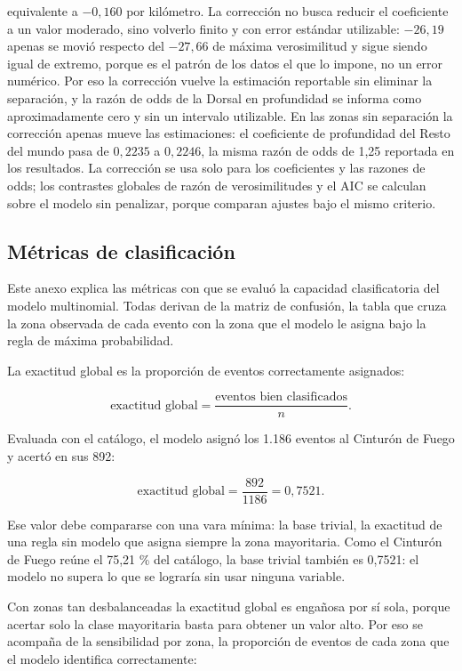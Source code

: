 \documentclass[
  spanish,
  letterpaper,
  DIV=11,
  numbers=noendperiod]{scrartcl}
\begin{document}
equivalente a \(-0{,}160\) por kilómetro. La corrección no busca reducir
el coeficiente a un valor moderado, sino volverlo finito y con error
estándar utilizable: \(-26{,}19\) apenas se movió respecto del
\(-27{,}66\) de máxima verosimilitud y sigue siendo igual de extremo,
porque es el patrón de los datos el que lo impone, no un error numérico.
Por eso la corrección vuelve la estimación reportable sin eliminar la
separación, y la razón de odds de la Dorsal en profundidad se informa
como aproximadamente cero y sin un intervalo utilizable. En las zonas
sin separación la corrección apenas mueve las estimaciones: el
coeficiente de profundidad del Resto del mundo pasa de \(0{,}2235\) a
\(0{,}2246\), la misma razón de odds de 1,25 reportada en los
resultados. La corrección se usa solo para los coeficientes y las
razones de odds; los contrastes globales de razón de verosimilitudes y
el AIC se calculan sobre el modelo sin penalizar, porque comparan
ajustes bajo el mismo criterio.

\subsection{Métricas de
clasificación}\label{sec-anexo-metricas-clasificacion}

Este anexo explica las métricas con que se evaluó la capacidad
clasificatoria del modelo multinomial. Todas derivan de la matriz de
confusión, la tabla que cruza la zona observada de cada evento con la
zona que el modelo le asigna bajo la regla de máxima probabilidad.

La exactitud global es la proporción de eventos correctamente asignados:

\[
\text{exactitud global}=\frac{\text{eventos bien clasificados}}{n}.
\]

Evaluada con el catálogo, el modelo asignó los 1.186 eventos al Cinturón
de Fuego y acertó en sus 892:

\[
\text{exactitud global}=\frac{892}{1186}=0{,}7521.
\]

Ese valor debe compararse con una vara mínima: la base trivial, la
exactitud de una regla sin modelo que asigna siempre la zona
mayoritaria. Como el Cinturón de Fuego reúne el 75,21 \% del catálogo,
la base trivial también es 0,7521: el modelo no supera lo que se
lograría sin usar ninguna variable.

Con zonas tan desbalanceadas la exactitud global es engañosa por sí
sola, porque acertar solo la clase mayoritaria basta para obtener un
valor alto. Por eso se acompaña de la sensibilidad por zona, la
proporción de eventos de cada zona que el modelo identifica
correctamente:
\end{document}
